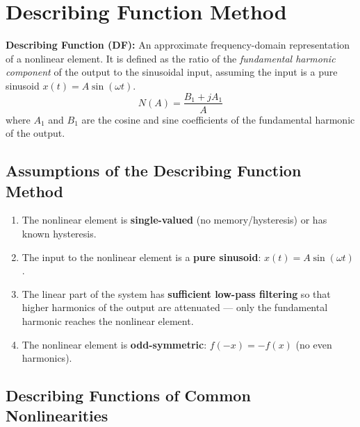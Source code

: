 \documentclass[12pt,a4paper]{article}
\begin{document}
\section{Describing Function Method}

\begin{tcolorbox}[defbox]
\textbf{Describing Function (DF):} An approximate frequency-domain representation of a nonlinear element. It is defined as the ratio of the \textit{fundamental harmonic component} of the output to the sinusoidal input, assuming the input is a pure sinusoid $x(t) = A\sin(\omega t)$.
$$N(A) = \frac{B_1 + jA_1}{A}$$
where $A_1$ and $B_1$ are the cosine and sine coefficients of the fundamental harmonic of the output.
\end{tcolorbox}

\subsection{Assumptions of the Describing Function Method}

\begin{enumerate}[label=\textbf{\arabic*.}, leftmargin=*, itemsep=3pt]
  \item The nonlinear element is \textbf{single-valued} (no memory/hysteresis) or has known hysteresis.
  \item The input to the nonlinear element is a \textbf{pure sinusoid}: $x(t) = A\sin(\omega t)$.
  \item The linear part of the system has \textbf{sufficient low-pass filtering} so that higher harmonics of the output are attenuated --- only the fundamental harmonic reaches the nonlinear element.
  \item The nonlinear element is \textbf{odd-symmetric}: $f(-x) = -f(x)$ (no even harmonics).
\end{enumerate}

\subsection{Describing Functions of Common Nonlinearities}
\end{document}
